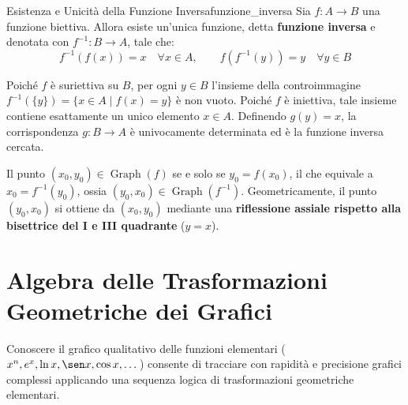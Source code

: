 \begin{teorema}{Esistenza e Unicità della Funzione Inversa}{funzione_inversa}
Sia $f \colon A \to B$ una funzione biettiva. Allora esiste un'unica funzione, detta \textbf{funzione inversa} e denotata con $f^{-1} \colon B \to A$, tale che:
\[
    f^{-1}(f(x)) = x \quad \forall x \in A, \qquad f(f^{-1}(y)) = y \quad \forall y \in B
\]
\end{teorema}

\begin{dimostrazione}
Poiché $f$ è suriettiva su $B$, per ogni $y \in B$ l'insieme della controimmagine $f^{-1}(\{y\}) = \{x \in A \mid f(x) = y\}$ è non vuoto. Poiché $f$ è iniettiva, tale insieme contiene esattamente un unico elemento $x \in A$. Definendo $g(y) = x$, la corrispondenza $g \colon B \to A$ è univocamente determinata ed è la funzione inversa cercata.
\end{dimostrazione}

\begin{osservazione}
Il punto $(x_0, y_0) \in \operatorname{Graph}(f)$ se e solo se $y_0 = f(x_0)$, il che equivale a $x_0 = f^{-1}(y_0)$, ossia $(y_0, x_0) \in \operatorname{Graph}(f^{-1})$.
Geometricamente, il punto $(y_0, x_0)$ si ottiene da $(x_0, y_0)$ mediante una \textbf{riflessione assiale rispetto alla bisettrice del I e III quadrante} ($y = x$).
\end{osservazione}

\section{Algebra delle Trasformazioni Geometriche dei Grafici}
\label{sec:trasformazioni_grafici_dettagli}

Conoscere il grafico qualitativo delle funzioni elementari ($x^n, e^x, \ln x, \sen x, \cos x, \dots$) consente di tracciare con rapidità e precisione grafici complessi applicando una sequenza logica di trasformazioni geometriche elementari.

